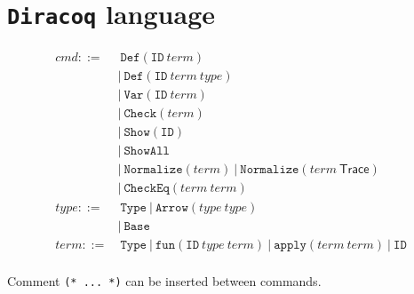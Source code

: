 \documentclass{article}
\begin{document}
\clearpage

\section{\texttt{Diracoq} language}

\begin{align*}
    cmd ::=&\ \texttt{Def}(\texttt{ID}\ term) \\
        &|\ \texttt{Def}(\texttt{ID}\ term\ type) \\
        &|\ \texttt{Var}(\texttt{ID}\ term) \\
        &|\ \texttt{Check}(term) \\
        &|\ \texttt{Show}(\texttt{ID}) \\
        &|\ \texttt{ShowAll} \\
        &|\ \texttt{Normalize}(term)\ |\ \texttt{Normalize}(term\ \textsf{Trace}) \\
        &|\ \texttt{CheckEq}(term\ term) \\
    type ::=&\ \texttt{Type}\ |\ \texttt{Arrow}(type\ type) \\
            &|\ \texttt{Base} \\
    term ::=&\ \texttt{Type}\ |\ \texttt{fun}(\texttt{ID}\ type\ term)\ |\ \texttt{apply}(term\ term)\ |\ \texttt{ID} \\
\end{align*}

Comment \texttt{(* ... *)} can be inserted between commands.
\end{document}
